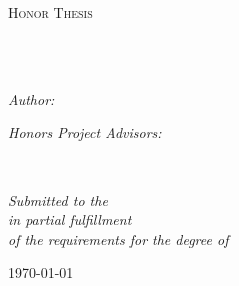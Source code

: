\documentclass[
11pt,
english, %
doublespacing,
liststotoc, %
headsepline, %
]{MastersDoctoralThesis} %
\author{Wenqin \textsc{Chen}} %
\begin{document}
\frontmatter %

\pagestyle{plain} %


\begin{titlepage}
\begin{center}

\vspace*{.06\textheight}
{\scshape\LARGE \univname\par}\vspace{1.5cm} %
\textsc{\Large Honor Thesis}\\[0.5cm] %

\HRule \\[0.4cm] %
{\huge \bfseries \ttitle\par}\vspace{0.4cm} %
\HRule \\[1.5cm] %
 
\begin{minipage}[t]{0.4\textwidth}
\begin{flushleft} \large
\emph{Author:}\\
\authorname %
\end{flushleft}
\end{minipage}
\begin{minipage}[t]{0.4\textwidth}
\begin{flushright} \large
\emph{Honors Project Advisors:} \\
\supname %
\end{flushright}
\end{minipage}\\[3cm]
 
\vfill

\large \textit{Submitted to the \deptname}\\
\textit{in partial fulfillment}\\
\textit{of the requirements for the degree of \degreename}
 
\vfill

{\large \today}\\[4cm] %
 
\vfill
\end{center}
\end{titlepage}
\end{document}
